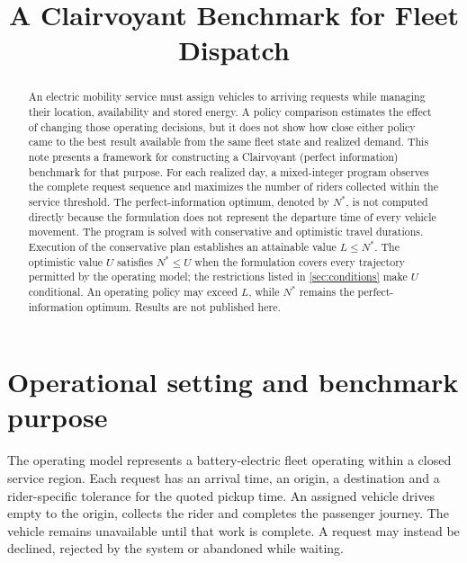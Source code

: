 

\title{\vspace{-1.25em}\textbf{A Clairvoyant Benchmark for Fleet Dispatch}}
\author{}
\date{}


\maketitle
\vspace{-1.4em}

\begin{abstract}
An electric mobility service must assign vehicles to arriving requests while managing their location,
availability and stored energy. A policy comparison estimates the effect of changing those operating
decisions, but it does not show how close either policy came to the best result available from the
same fleet state and realized demand. This note presents a framework for constructing a Clairvoyant
(perfect information) benchmark for that purpose. For each realized day, a mixed-integer program observes the
complete request sequence and maximizes the number of riders collected within the service threshold.
The perfect-information optimum, denoted by $N^*$, is not computed directly because the formulation does
not represent the departure time of every vehicle movement. The program is solved with conservative and
optimistic travel durations. Execution of the conservative plan establishes an attainable value
$L\leq N^*$. The optimistic value $U$ satisfies $N^*\leq U$ when the formulation covers every trajectory
permitted by the operating model; the restrictions listed in \cref{sec:conditions} make $U$ conditional.
An operating policy may exceed $L$, while $N^*$ remains the perfect-information optimum. Results are
not published here.
\end{abstract}

\section{Operational setting and benchmark purpose}

The operating model represents a battery-electric fleet operating within a closed service region. Each
request has an arrival time, an origin, a destination and a rider-specific tolerance for the quoted
pickup time. An assigned vehicle drives empty to the origin, collects the rider and completes the
passenger journey. The vehicle remains unavailable until that work is complete. A request may instead
be declined, rejected by the system or abandoned while waiting.


